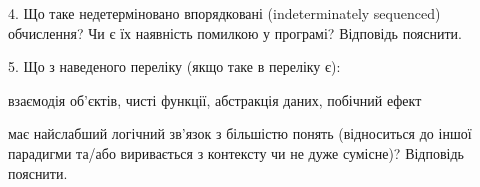 \documentclass[12pt, ukrainian]{article}
\begin{document}
\begin {large}
{\vspace{5mm}
4. Що таке недетерміновано впорядковані (indeterminately sequenced) обчислення? Чи є їх наявність помилкою у програмі?  Відповідь пояснити.



\vspace{5mm}
5. Що з наведеного переліку (якщо таке в переліку є):

\vspace{4mm}
\qquad взаємодія об’єктів, чисті функції, абстракція даних, побічний ефект

\vspace{4mm}
має найслабший логічний зв’язок з більшістю понять (відноситься до іншої парадигми та/або виривається з контексту чи не дуже сумісне)? Відповідь пояснити.

}
\end {large}
\end{document}
